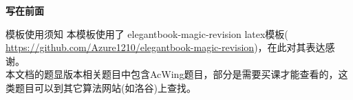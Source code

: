 \frontmatter
\thispagestyle{empty}
\newpage
\begin{center}
	\textbf{\LARGE 写在前面}
\end{center}
\begin{ascolorbox5}{模板使用须知}
本模板使用了 elegantbook-magic-revision latex模板( \href{https://github.com/Azure1210/elegantbook-magic-revision}{https://github.com/Azure1210/elegantbook-magic-revision})，在此对其表达感谢。\\
\ifshowLink
本文档的题显版本相关题目中包含AcWing题目，部分是需要买课才能查看的，这类题目可以到其它算法网站(如洛谷)上查找。
\fi

\end{ascolorbox5}